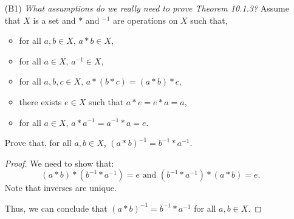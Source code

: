 \documentclass{article}
\begin{document}
\begin{itemize}
	\item [(B1)] \emph{What assumptions do we really need to prove Theorem 10.1.3?}  Assume that $X$ is a set and $*$ and ${}^{\minus1}$ are operations on $X$ such that,
		\begin{itemize}
			\item for all $a, b \in X$, $a * b \in X$,
			\item for all $a \in X$, $a^{\minus1} \in X$,
			\item for all $a, b, c \in X$, $a * (b * c) = (a * b) * c$,
			\item there exists $e \in X$ such that $a * e = e * a = a$,
			\item for all $a \in X$, $a * a^{\minus1} = a^{\minus1} * a = e$.
		\end{itemize}
        Prove that, for all $a, b \in X$, $(a * b)^{-1} = b^{-1} * a^{-1}$.
            \begin{proof}
                We need to show that:
                    \[
                    (a * b) * (b^{\minus1} * a^{\minus1}) = e \text{ and } 
                    (b^{\minus1} * a^{\minus1}) * (a * b) = e.
                    \]
                    Note that inverses are unique.
                \begin{caseof}
                \end{caseof}
                Thus, we can conclude that $(a * b)^{-1} = b^{-1} * a^{-1}$ for all $a, b \in X$.
            \end{proof}


\end{itemize}
\end{document}
